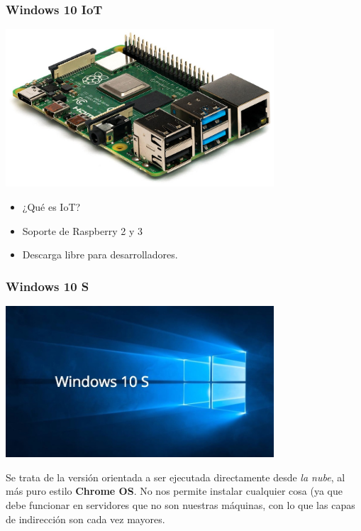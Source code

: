 \documentclass[11pt]{article}
\begin{document}
\newpage
\subsubsection{Windows 10 IoT}
\label{sec:org65e1f55}

\begin{center}
\includegraphics[width=10cm]{./imgs/raspberry-pi.jpg}
\end{center}    

\begin{itemize}
\item ¿Qué es IoT?
\item Soporte de Raspberry 2 y 3
\item Descarga libre para desarrolladores.
\end{itemize}

\newpage
\subsubsection{Windows 10 S}
\label{sec:org81c4843}

\begin{center}
\includegraphics[width=10cm]{./imgs/win10-s.jpg }
\end{center}
Se trata de la versión orientada a ser ejecutada directamente desde \emph{la nube}, al más puro estilo
\textbf{Chrome OS}. No nos permite instalar cualquier cosa (ya que debe funcionar en servidores que no
son nuestras máquinas, con lo que las capas de indirección son cada vez mayores.
\end{document}
